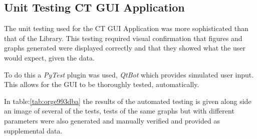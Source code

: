 \documentclass[11pt]{report}
\begin{document}
\clearpage

\subsection{Unit Testing CT GUI Application}
\label{sec:orgedd7d23}

The unit testing used for the CT GUI Application was more sophisticated than that of the Library. This testing required visual confirmation that figures and graphs generated were displayed correctly and that they showed what the user would expect, given the data.

To do this a \emph{PyTest} plugin was used, \emph{QtBot} which provides simulated user input. This allows for the GUI to be thoroughly tested, automatically.

In table:\ref{tab:orge993dba} the results of the automated testing is given along side an image of several of the tests, tests of the same graphs but with different parameters were also generated and manually verified and provided as supplemental data.
\end{document}
